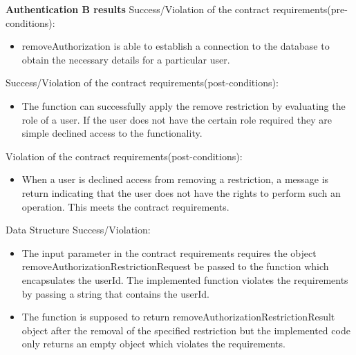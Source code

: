 \noindent
\textbf{Authentication B results}\newline
Success/Violation of the contract requirements(pre-conditions):
\begin{itemize}
	\item removeAuthorization is able to establish a connection to the database to obtain the necessary details for a particular user.
\end{itemize}

\noindent
Success/Violation of the contract requirements(post-conditions):
\begin{itemize}
	\item The function can successfully apply the remove restriction by evaluating the role of a user. If the user does not have the certain role required they are simple declined access to the functionality.
\end{itemize} 

\noindent
Violation of the contract requirements(post-conditions):
\begin{itemize}
	\item When a user is declined access from removing a restriction, a message is return indicating that the user does not have the rights to perform such an operation. This meets the contract requirements.
\end{itemize}

\noindent
Data Structure Success/Violation:
\begin{itemize}
	\item The input parameter in the contract requirements requires the object removeAuthorizationRestrictionRequest be passed to the function which encapsulates the userId. The implemented function violates the requirements by passing a string that contains the userId.
	\item The function is supposed to return removeAuthorizationRestrictionResult object after the removal of the specified restriction but the implemented code only returns an empty object which violates the requirements.
\end{itemize} 











